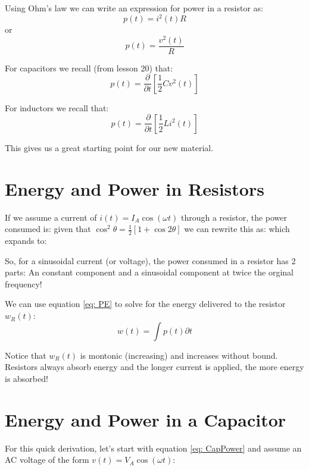 \documentclass{handout}
\begin{document}
Using Ohm's law we can write an expression for power in a resistor as:
\begin{equation}
p(t)=i^2(t)R
\label{eq: ResistorPower}
\end{equation}
or
\[
p(t)=\frac{v^2(t)}{R}
\]

For capacitors we recall (from lesson 20) that:
\begin{equation}
p(t) = \frac{\partial }{\partial t}\left[ \frac{1}{2}Cv^2(t) \right]
\label{eq: CapPower}
\end{equation}

For inductors we recall that:
\begin{equation}
p(t) = \frac{\partial }{\partial t}\left[ \frac{1}{2}Li^2(t) \right]
\label{eq: IndPower}
\end{equation}

This gives us a great starting point for our new material.

\section{Energy and Power in Resistors}
If we assume a current of $i(t)=I_A\cos(\omega t)$ through a resistor, the power consumed is:
\soln{0.75in}{
\[
p_R(t) = I_A^2R\cos^2(\omega t)
\]
}
given that $\cos^2\theta = \frac{1}{2}\left[ 1+\cos 2\theta \right]$ we can rewrite this as:
\soln{0.75in}{
\[
p_R(t) = \frac{I_A^2R}{2}\left[ 1+\cos(2\omega t)\right]
\]
}
which expands to:
\soln{0.75in}{
\[
p_R(t) = \frac{I_A^2R}{2}+\frac{I_A^2R}{2}\cos(2\omega t)
\]
}

So, for a sinusoidal current (or voltage), the power consumed in a resistor has 2 parts: An constant component and a sinusoidal component at twice the orginal frequency!

We can use equation \ref{eq: PE} to solve for the energy delivered to the resistor $w_R(t)$:
\[
w(t) = \int p(t) \partial t
\]

Notice that $w_R(t)$ is montonic (increasing) and increases without bound.  Resistors always absorb energy and the longer current is applied, the more energy is absorbed!

\newpage
\clearpage
\pagebreak

\section{Energy and Power in a Capacitor}
For this quick derivation, let's start with equation \ref{eq: CapPower} and assume an AC voltage of the form $v(t) = V_A\cos(\omega t)$:
\soln{1in}{
\[
p_C(t) = \frac{\partial }{\partial t}\left[ \frac{1}{2}CV_A^2\cos^2(\omega t) \right]
\]
}
\end{document}
